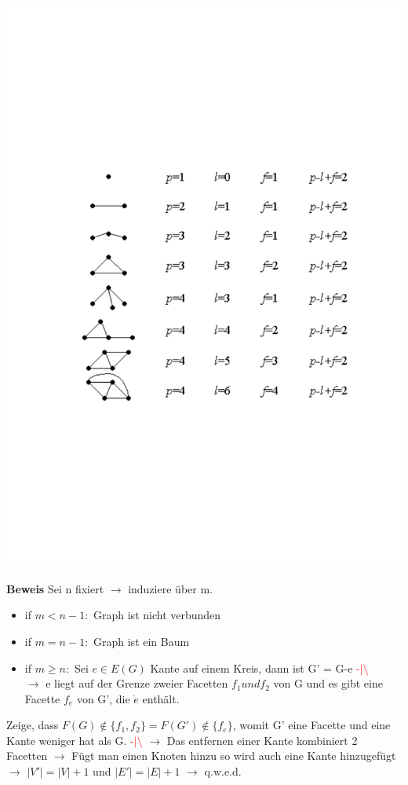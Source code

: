 \includegraphics[scale=0.5]{lectures/161118/pix/planareGraphenElementar.pdf}\newline

\textbf{Beweis} \newline
Sei n fixiert $\rightarrow$ induziere über m.
\begin{itemize}
	\item if $m < n -1:$ Graph ist nicht verbunden
	\item if $m = n -1:$ Graph ist ein Baum
	\item if $m \ge n:$ Sei $e \in E(G)$ Kante auf einem Kreis, dann ist G' = G-e \textcolor{red}{-$|\setminus$}\\ $\rightarrow$ e liegt auf der Grenze zweier Facetten $f_1 und f_2$ von G und es gibt eine Facette $f_e$ von G', die $\dot{e}$ enthält. 
\end{itemize}
Zeige, dass $F(G) \notin \{f_1, f_2\} = F(G') \notin \{f_e\}$, womit G' eine Facette und eine Kante weniger hat als G. \textcolor{red}{-$|\setminus$}\newline
$\rightarrow$ Das entfernen einer Kante kombiniert 2 Facetten \newline
$\rightarrow$ Fügt man einen Knoten hinzu so wird auch eine Kante hinzugefügt \newline
$\rightarrow$ $|V'|=|V|+1$ und $|E'|=|E|+1$ $\rightarrow$ q.w.e.d. \newline

